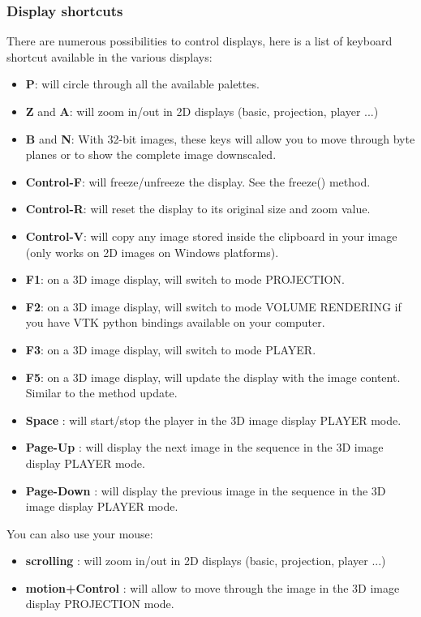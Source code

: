 \documentclass[a4paper,10pt,oneside]{article}
\begin{document}
\subsubsection{Display shortcuts}
\label{cha:dis_shortcuts}

There are numerous possibilities to control displays, here is a list of
keyboard shortcut available in the various displays:

\begin{itemize}
\item \textbf{P}: will circle through all the available palettes.
\item \textbf{Z} and \textbf{A}: will zoom in/out in 2D displays (basic, 
projection, player ...)
\item \textbf{B} and \textbf{N}: With 32-bit images, these keys will allow you
to move through byte planes or to show the complete image downscaled.
\item \textbf{Control-F}: will freeze/unfreeze the display. See the freeze() 
method.
\item \textbf{Control-R}: will reset the display to its original size and
zoom value.
\item \textbf{Control-V}: will copy any image stored inside the clipboard 
in your image (only works on 2D images on Windows platforms).
\item \textbf{F1}: on a 3D image display, will switch to mode PROJECTION.
\item \textbf{F2}: on a 3D image display, will switch to mode VOLUME
RENDERING if you have VTK python bindings available on your computer.
\item \textbf{F3}: on a 3D image display, will switch to mode PLAYER.
\item \textbf{F5}: on a 3D image display, will update the display with
the image content. Similar to the method update.
\item \textbf{Space} : will start/stop the player in the 3D image display
PLAYER mode.
\item \textbf{Page-Up} : will display the next image in the sequence in the
3D image display PLAYER mode.
\item \textbf{Page-Down} : will display the previous image in the sequence
in the 3D image display PLAYER mode.
\end{itemize}

You can also use your mouse:

\begin{itemize}
\item \textbf{scrolling} : will zoom in/out in 2D displays (basic, 
projection, player ...)
\item \textbf{motion+Control} : will allow to move through the image
in the 3D image display PROJECTION mode.
\end{itemize}
\end{document}
